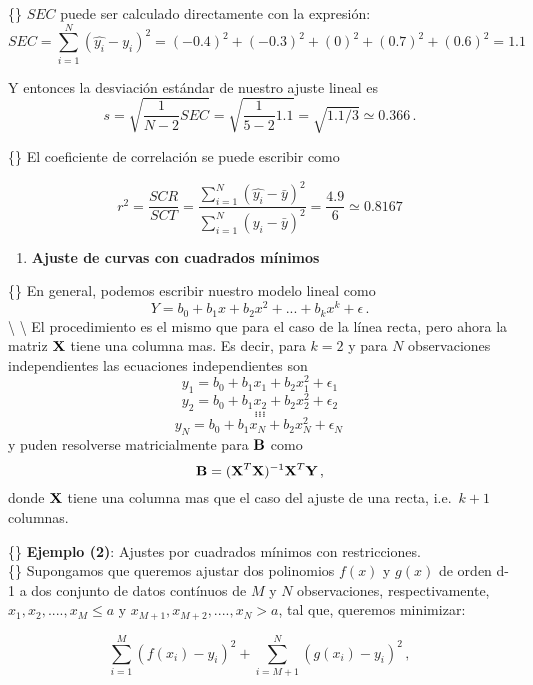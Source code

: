 \documentclass[
]{agujournal2019}
\providecommand{\tightlist}{%
  \setlength{\itemsep}{0pt}\setlength{\parskip}{0pt}}\usepackage{longtable,booktabs,array}
\begin{document}
\{\noindent\} \(SEC\) puede ser calculado directamente con la expresión:
\[SEC=\sum \limits^N_{i=1}(\hat{y_i}-y_i)^2=
   (-0.4)^2 + (-0.3)^2+(0)^2 + (0.7)^2 + (0.6)^2=1.1\]

\noindent Y entonces la desviación estándar de nuestro ajuste lineal es
\[s=\sqrt{\frac{1}{N-2}SEC}=\sqrt{\frac{1}{5-2}1.1}=\sqrt{1.1/3}\simeq0.366\,.\]

\{\noindent\} El coeficiente de correlación se puede escribir como

\[r^2=\frac{SCR}{SCT}=\frac{\sum\limits^N_{i=1}(\hat{y_i}-\bar{y})^2}{\sum\limits^N_{i=1}
({y_i}-\bar{y})^2}=\frac{4.9}{6}\simeq0.8167\]

\vspace{0.5cm}

\begin{enumerate}
\def\labelenumi{(\arabic{enumi})}
\setcounter{enumi}{3}
\tightlist
\item
  \textbf{Ajuste de curvas con cuadrados mínimos} ~
\end{enumerate}

\{\noindent\} En general, podemos escribir nuestro modelo lineal como
\[Y=b_0 + b_1x + b_2 x^2 + ... + b_k x^k + \epsilon\,.\]
\textbackslash{} \textbackslash{} \noindent El procedimiento es el mismo
que para el caso de la línea recta, pero ahora la matriz \({\textbf X}\)
tiene una columna mas. Es decir, para \(k=2\) y para \(N\) observaciones
independientes las ecuaciones independientes son
\[y_1=b_0 + b_1x_1 + b_2 x_1^2 + \epsilon_1\]
\[y_2=b_0 + b_1x_2 + b_2 x_2^2 + \epsilon_2\] \[...\] \[...\] \[...\]
\[y_N=b_0 + b_1x_N + b_2 x_N^2 + \epsilon_N\,\] y puden resolverse
matricialmente para \({\textbf B}\) como
\[{\textbf B}=({\textbf X}^T{\textbf X})^{-1}{\textbf X}^T{\textbf Y}\,,\]
donde \({\textbf X}\) tiene una columna mas que el caso del ajuste de
una recta, i.e.~\(k+1\) columnas.

\vspace{0.5cm}

\{\noindent\} \textbf{Ejemplo (2)}: Ajustes por cuadrados mínimos con
restricciones.\\

\{\noindent\} Supongamos que queremos ajustar dos polinomios \(f(x)\) y
\(g(x)\) de orden d-1 a dos conjunto de datos contínuos de \(M\) y \(N\)
observaciones, respectivamente, \(x_1, x_2, ....,x_M\leq a\) y
\(x_{M+1}, x_{M+2}, ....,x_N>a\), tal que, queremos minimizar:

\[\sum\limits^M_{i=1}(f(x_i)-y_i)^2 + \sum\limits^N_{i=M+1}(g(x_i)-y_i)^2\,,\]
\end{document}
